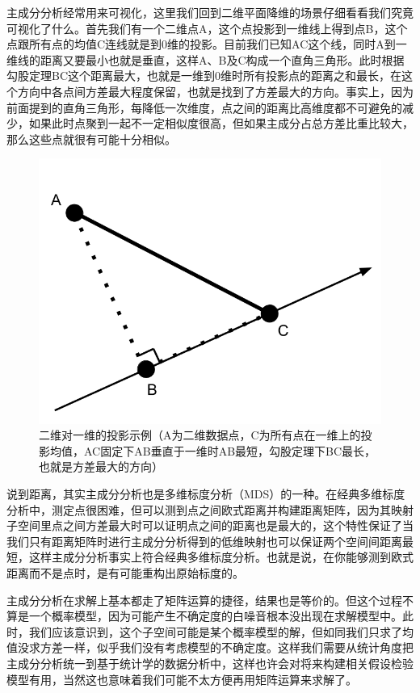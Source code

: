 \documentclass[]{tufte-book}
\begin{document}
主成分分析经常用来可视化，这里我们回到二维平面降维的场景仔细看看我们究竟可视化了什么。首先我们有一个二维点A，这个点投影到一维线上得到点B，这个点跟所有点的均值C连线就是到0维的投影。目前我们已知AC这个线，同时A到一维线的距离又要最小也就是垂直，这样A、B及C构成一个直角三角形。此时根据勾股定理BC这个距离最大，也就是一维到0维时所有投影点的距离之和最长，在这个方向中各点间方差最大程度保留，也就是找到了方差最大的方向。事实上，因为前面提到的直角三角形，每降低一次维度，点之间的距离比高维度都不可避免的减少，如果此时点聚到一起不一定相似度很高，但如果主成分占总方差比重比较大，那么这些点就很有可能十分相似。

\begin{figure}
\includegraphics{data/PCA} \caption[二维对一维的投影示例（A为二维数据点，C为所有点在一维上的投影均值，AC固定下AB垂直于一维时AB最短，勾股定理下BC最长，也就是方差最大的方向）]{二维对一维的投影示例（A为二维数据点，C为所有点在一维上的投影均值，AC固定下AB垂直于一维时AB最短，勾股定理下BC最长，也就是方差最大的方向）}\label{fig:unnamed-chunk-33}
\end{figure}

说到距离，其实主成分分析也是多维标度分析（MDS）的一种。在经典多维标度分析中，测定点很困难，但可以测到点之间欧式距离并构建距离矩阵，因为其映射子空间里点之间方差最大时可以证明点之间的距离也是最大的，这个特性保证了当我们只有距离矩阵时进行主成分分析得到的低维映射也可以保证两个空间间距离最短，这样主成分分析事实上符合经典多维标度分析。也就是说，在你能够测到欧式距离而不是点时，是有可能重构出原始标度的。

主成分分析在求解上基本都走了矩阵运算的捷径，结果也是等价的。但这个过程不算是一个概率模型，因为可能产生不确定度的白噪音根本没出现在求解模型中。此时，我们应该意识到，这个子空间可能是某个概率模型的解，但如同我们只求了均值没求方差一样，似乎我们没有考虑模型的不确定度。这样我们需要从统计角度把主成分分析统一到基于统计学的数据分析中，这样也许会对将来构建相关假设检验模型有用，当然这也意味着我们可能不太方便再用矩阵运算来求解了。
\end{document}
